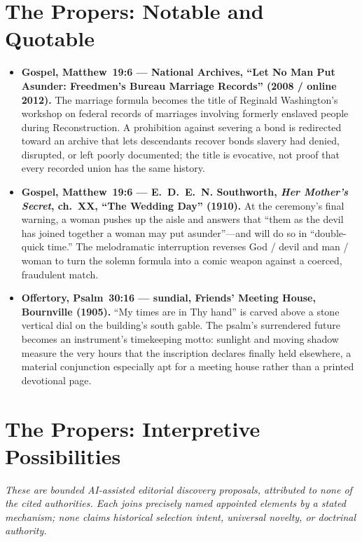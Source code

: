 \section*{The Propers: Notable and Quotable}

{\small
\begin{itemize}
\item \textbf{Gospel, Matthew~19:6 --- National Archives, ``Let No Man Put Asunder: Freedmen's Bureau Marriage Records'' (2008 / online 2012).} The marriage formula becomes the title of Reginald Washington's workshop on federal records of marriages involving formerly enslaved people during Reconstruction. A prohibition against severing a bond is redirected toward an archive that lets descendants recover bonds slavery had denied, disrupted, or left poorly documented; the title is evocative, not proof that every recorded union has the same history.

\item \textbf{Gospel, Matthew~19:6 --- E.~D.~E.~N. Southworth, \emph{Her Mother's Secret}, ch.~XX, ``The Wedding Day'' (1910).} At the ceremony's final warning, a woman pushes up the aisle and answers that ``them as the devil has joined together a woman may put asunder''---and will do so in ``double-quick time.'' The melodramatic interruption reverses God / devil and man / woman to turn the solemn formula into a comic weapon against a coerced, fraudulent match.

\item \textbf{Offertory, Psalm~30:16 --- sundial, Friends' Meeting House, Bournville (1905).} ``My times are in Thy hand'' is carved above a stone vertical dial on the building's south gable. The psalm's surrendered future becomes an instrument's timekeeping motto: sunlight and moving shadow measure the very hours that the inscription declares finally held elsewhere, a material conjunction especially apt for a meeting house rather than a printed devotional page.
\end{itemize}
}

\section*{The Propers: Interpretive Possibilities}

\noindent\emph{These are bounded AI-assisted editorial discovery proposals, attributed to none of the cited authorities. Each joins precisely named appointed elements by a stated mechanism; none claims historical selection intent, universal novelty, or doctrinal authority.}

